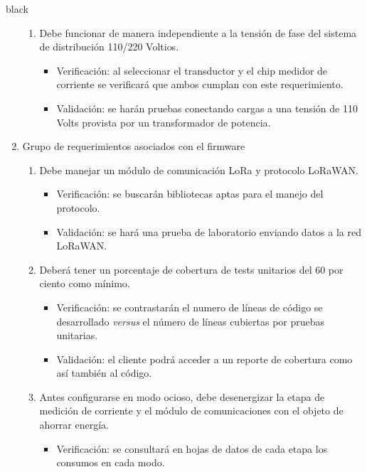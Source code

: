 \documentclass[11pt]{charter}
\begin{document}
\begin{consigna}{black}
\begin{enumerate}
\begin{enumerate}[label*=\arabic*.]
			\item Debe funcionar de manera independiente a la tensión de fase del sistema de distribución 110/220 Voltios.
				\begin{itemize}
					\item Verificación: al seleccionar el transductor y el chip medidor de corriente se verificará que ambos cumplan con este requerimiento.\\
					\item Validación: se harán pruebas conectando cargas a una tensión de 110 Volts provista por un transformador de potencia.\\
				\end{itemize}			

	\end{enumerate}
	\item Grupo de requerimientos asociados con el firmware
		\begin{enumerate}[label*=\arabic*.]
			\item Debe manejar un módulo de comunicación LoRa y protocolo LoRaWAN.
				\begin{itemize}
					\item Verificación: se buscarán bibliotecas aptas para el manejo del protocolo.\\
					\item Validación: se hará una prueba de laboratorio enviando datos a la red LoRaWAN.\\
				\end{itemize}
			\item Deberá tener un porcentaje de cobertura de tests unitarios del 60 por ciento como mínimo.
				\begin{itemize}
					\item Verificación: se contrastarán el numero de líneas de código se desarrollado \textit{versus} el número de líneas cubiertas por pruebas unitarias.\\
					\item Validación: el cliente podrá acceder a un reporte de cobertura como así también al código.\\
				\end{itemize}
			\item Antes configurarse en modo ocioso, debe desenergizar la etapa de medición de corriente y el módulo de comunicaciones con el objeto de ahorrar energía.
				\begin{itemize}
					\item Verificación: se consultará en hojas de datos de cada etapa los consumos en cada modo.\\

\end{itemize}
\end{enumerate}
\end{enumerate}
\end{consigna}
\end{document}
